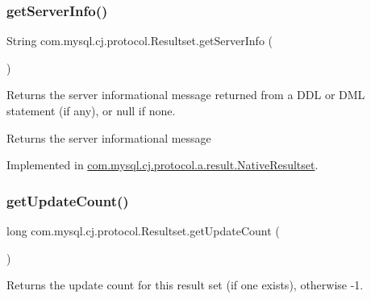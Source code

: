 \mbox{\label{interfacecom_1_1mysql_1_1cj_1_1protocol_1_1_resultset_a41ec899fbc6875d7b31245be7245ae9a}} 
\subsubsection{\texorpdfstring{get\+Server\+Info()}{getServerInfo()}}
{\footnotesize\ttfamily String com.\+mysql.\+cj.\+protocol.\+Resultset.\+get\+Server\+Info (\begin{DoxyParamCaption}{ }\end{DoxyParamCaption})}

Returns the server informational message returned from a D\+DL or D\+ML statement (if any), or null if none.

\begin{DoxyReturn}{Returns}
the server informational message 
\end{DoxyReturn}


Implemented in \mbox{\hyperlink{classcom_1_1mysql_1_1cj_1_1protocol_1_1a_1_1result_1_1_native_resultset_a02eab42717038056dfd049351e3d13b1}{com.\+mysql.\+cj.\+protocol.\+a.\+result.\+Native\+Resultset}}.

\mbox{\label{interfacecom_1_1mysql_1_1cj_1_1protocol_1_1_resultset_a72a3e90cf2affd2bbc8826a2c2e39df9}} 
\subsubsection{\texorpdfstring{get\+Update\+Count()}{getUpdateCount()}}
{\footnotesize\ttfamily long com.\+mysql.\+cj.\+protocol.\+Resultset.\+get\+Update\+Count (\begin{DoxyParamCaption}{ }\end{DoxyParamCaption})}

Returns the update count for this result set (if one exists), otherwise -\/1.

